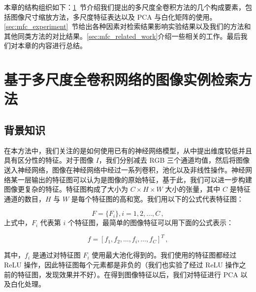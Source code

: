 本章的结构组织如下：\ref{sec:mfc_factor_explaination}~节介绍我们提出的多尺度全卷积方法的几个构成要素，包括图像尺寸缩放方法，多尺度特征表达以及 PCA 与白化矩阵的使用。\ref{sec:mfc_experiment}~节给出各种因素对检索结果影响实验结果以及我们的方法和其他同类方法的对比结果。\ref{sec:mfc_related_work}介绍一些相关的工作。最后我们对本章的内容进行总结。

\section{基于多尺度全卷积网络的图像实例检索方法}\label{sec:mfc_factor_explaination}
\subsection{背景知识}
在本方法中，我们关注的是如何使用已有的神经网络模型，从中提出维度较低并且具有区分性的特征。对于图像 $I$，我们分别减去 RGB 三个通道均值，然后将图像送入神经网络，图像在神经网络中经过一系列卷积，池化以及非线性操作。神经网络某一层输出的特征图可以认为是图像的原始特征，基于此，我们可以进一步构建图像更复杂的特征。特征图构成了大小为 $C \times H \times  W$ 大小的张量，其中 $C$ 是特征通道的数目，$H$ 与 $W$ 是每个特征图的高和宽。我们用以下的公式代表特征图：

\begin{equation}
F=\{F_i\}, i=1,2,\ldots, C\, ,
\end{equation}
上式中，$F_i$ 代表第 $i$ 个特征图，最简单的图像特征可以用下面的公式表示：

\begin{equation}\label{eq:single_scale}
f = [f_1, f_2, \ldots, f_i, \ldots, f_C]^T\, ,
\end{equation}

其中，$f_i$ 是通过对特征图 $F_i$ 使用最大池化得到的。我们使用的特征图都经过 ReLU 操作，因此特征图每个元素都是非负的（我们也实验了经过 ReLU 操作之前的特征图，发现效果并不好）。在得到图像特征以后，我们对特征进行 PCA 以及白化处理。

